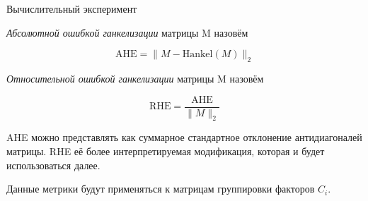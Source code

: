 	\begin{frame}{Вычислительный эксперимент}
		
		\begin{Def}
			\emph{Абсолютной ошибкой ганкелизации} матрицы M назовём 
			
			\[
			\text{AHE} = \lVert M - \text{Hankel}(M) \rVert_2
			\] 
		\end{Def}
		
		\begin{Def}		
			
			\emph{Относительной ошибкой ганкелизации} матрицы M назовём 
			
			\[
			\text{RHE} = \frac{\text{AHE}}{\lVert M \rVert_2} 
			\] 		
			
		\end{Def}
		
		AHE можно представлять как суммарное стандартное отклонение антидиагоналей матрицы. RHE её более интерпретируемая модификация, которая и будет использоваться далее. 
		
		Данные метрики будут применяться к матрицам группировки факторов $ C_i $.
	
	\end{frame}
	
